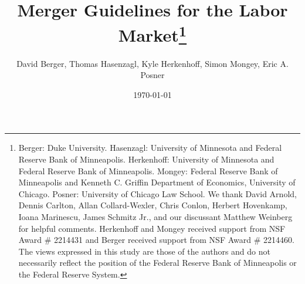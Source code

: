 \documentclass[12pt]{article}
\theoremstyle{prop}
\begin{document}
	

\title{Merger Guidelines for the Labor Market\thanks{
		Berger: Duke University.
		Hasenzagl:  University of Minnesota and Federal Reserve Bank of Minneapolis. 
		Herkenhoff:  University of Minnesota and  Federal Reserve Bank of Minneapolis. 
		Mongey: Federal Reserve Bank of Minneapolis and Kenneth C. Griffin Department of Economics, University of Chicago.
		Posner: University of Chicago Law School.
  We thank David Arnold, Dennis Carlton, Allan Collard-Wexler, Chris Conlon, Herbert Hovenkamp, Ioana Marinescu, James Schmitz Jr., and our discussant Matthew Weinberg for helpful comments. 
  Herkenhoff and Mongey received support from NSF Award \# 2214431 and Berger received support from NSF Award \# 2214460.
		The views expressed in this study are those of the authors and do not necessarily reflect the position of the Federal Reserve Bank of Minneapolis or the Federal Reserve System.}
}
\author{\hspace*{-.5cm} David Berger,  Thomas Hasenzagl, Kyle Herkenhoff, Simon Mongey, Eric A. Posner}
\date{\today}
\maketitle

\vspace{-1cm}
\begin{center}
	\begin{large}
	\end{large}
\end{center}
\end{document}
